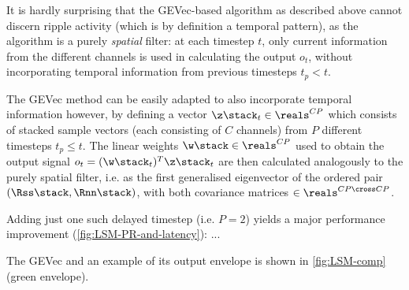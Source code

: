 \label{sec:spatiotemporal}

It is hardly surprising that the GEVec-based algorithm as described above cannot discern ripple activity (which is by definition a temporal pattern), as the algorithm is a purely \emph{spatial} filter: at each timestep $t$, only current information from the different channels is used in calculating the output $o_t$, without incorporating temporal information from previous timesteps $t_p < t$.

The GEVec method can be easily adapted to also incorporate temporal information however, by defining a vector $\z\stack_t \in \reals^{CP}$ which consists of stacked sample vectors (each consisting of $C$ channels) from $P$ different timesteps $t_p \leq t$. The linear weights $\w\stack \in \reals^{CP}$ used to obtain the output signal $o_t = (\w\stack_t)^T \z\stack_t$ are then calculated analogously to the purely spatial filter, i.e. as the first generalised eigenvector of the ordered pair $(\Rss\stack, \Rnn\stack)$, with both covariance matrices $\in \reals^{CP \cross CP}$.

Adding just one such delayed timestep (i.e. $P = 2$) yields a major performance improvement (\cref{fig:LSM-PR-and-latency}): ...

The GEVec and an example of its output envelope is shown in \cref{fig:LSM-comp} (green envelope).
